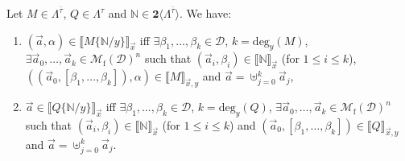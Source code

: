 \documentclass{LMCS}
\newcommand{\bool}{\mathbf{2}}
\newcommand{\Set}[1]{\Lambda^{#1}}
\newcommand{\sums}[1]{\bool\langle\Set{#1}\rangle}
\newcommand{\subst}[2]{\{ #2 / #1 \}}	\newcommand{\dg}[2]{\mathrm{deg}_{#1}(#2)} \newcommand{\obsle}{\sqsubseteq_{\mathcal{O}}}
\newcommand{\Int}[1]{\llbracket #1\rrbracket} \newcommand{\trm}[1]{#1^{\textrm{--}}}
\newcommand{\Mfin}[1]{\mathcal{M}_{\mathrm{f}}(#1)}
\newcommand{\mcup}{\uplus}
\newcommand{\seq}[1]{\vec{#1}}
\newcommand{\sN}{\mathbb{N}}
\newcommand{\gt}{\ensuremath{\tau}}
\newcommand{\gto}{\ensuremath{\bar\tau}}
\newcommand{\cD}{\mathcal{D}}
\begin{document}
\begin{lem}
Let $M\in\Set{\gto}$, $Q\in\Set{\gt}$ and $\sN\in\sums{\gto}$. 
We have:
\begin{enumerate}[\em(i)]
\item $(\seq a, \alpha)\in \Int{M\subst{y}{\sN}}_{\seq x}$ iff 
	$\exists\beta_1,\ldots,\beta_k\in \cD$, $k=\dg{y}{M}$,
	$\exists\seq a_0,\ldots,\seq a_{k}\in\Mfin{\cD}^n$ such that
	$(\seq a_i,\beta_i)\in\Int{\sN}_{\seq x}$ (for $1\le i \le k$),
	$((\seq a_0,[\beta_1,\ldots,\beta_k]), \alpha)\in\Int{M}_{\seq x,y}$ and 
	$\seq a = \mcup_{j=0}^{k} \seq a_j$,
\item $\seq a\in \Int{Q\subst{y}{\sN}}_{\seq x}$ iff 
	$\exists\beta_1,\ldots,\beta_k\in \cD$, $k=\dg{y}{Q}$,
	$\exists\seq a_0,\ldots,\seq a_{k}\in\Mfin{\cD}^n$ such that
	$(\seq a_i,\beta_i)\in\Int{\sN}_{\seq x}$ (for $1\le i \le k$) and
	$(\seq a_0,[\beta_1,\ldots,\beta_k])\in\Int{Q}_{\seq x,y}$ and 
	$\seq a = \mcup_{j=0}^{k} \seq a_j$.
\end{enumerate}
\end{lem}
\end{document}
